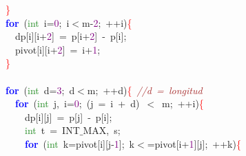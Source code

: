 {{\mbox{}\ \ \ \ \textcolor{Red}{\}} \\
\mbox{}\ \ \ \ \textbf{\textcolor{Blue}{for}}\ \textcolor{BrickRed}{(}\textcolor{ForestGreen}{int}\ i\textcolor{BrickRed}{=}\textcolor{Purple}{0}\textcolor{BrickRed}{;}\ i\textcolor{BrickRed}{$<$}m\textcolor{BrickRed}{-}\textcolor{Purple}{2}\textcolor{BrickRed}{;}\ \textcolor{BrickRed}{++}i\textcolor{BrickRed}{)}\textcolor{Red}{\{} \\
\mbox{}\ \ \ \ \ \ dp\textcolor{BrickRed}{[}i\textcolor{BrickRed}{][}i\textcolor{BrickRed}{+}\textcolor{Purple}{2}\textcolor{BrickRed}{]}\ \textcolor{BrickRed}{=}\ p\textcolor{BrickRed}{[}i\textcolor{BrickRed}{+}\textcolor{Purple}{2}\textcolor{BrickRed}{]}\ \textcolor{BrickRed}{-}\ p\textcolor{BrickRed}{[}i\textcolor{BrickRed}{];} \\
\mbox{}\ \ \ \ \ \ pivot\textcolor{BrickRed}{[}i\textcolor{BrickRed}{][}i\textcolor{BrickRed}{+}\textcolor{Purple}{2}\textcolor{BrickRed}{]}\ \textcolor{BrickRed}{=}\ i\textcolor{BrickRed}{+}\textcolor{Purple}{1}\textcolor{BrickRed}{;} \\
\mbox{}\ \ \ \ \textcolor{Red}{\}} \\
\mbox{}\ \ \ \  \\
\mbox{}\ \ \ \ \textbf{\textcolor{Blue}{for}}\ \textcolor{BrickRed}{(}\textcolor{ForestGreen}{int}\ d\textcolor{BrickRed}{=}\textcolor{Purple}{3}\textcolor{BrickRed}{;}\ d\textcolor{BrickRed}{$<$}m\textcolor{BrickRed}{;}\ \textcolor{BrickRed}{++}d\textcolor{BrickRed}{)}\textcolor{Red}{\{}\ \textit{\textcolor{Brown}{//d\ =\ longitud}} \\
\mbox{}\ \ \ \ \ \ \textbf{\textcolor{Blue}{for}}\ \textcolor{BrickRed}{(}\textcolor{ForestGreen}{int}\ j\textcolor{BrickRed}{,}\ i\textcolor{BrickRed}{=}\textcolor{Purple}{0}\textcolor{BrickRed}{;}\ \textcolor{BrickRed}{(}j\ \textcolor{BrickRed}{=}\ i\ \textcolor{BrickRed}{+}\ d\textcolor{BrickRed}{)}\ \textcolor{BrickRed}{$<$}\ m\textcolor{BrickRed}{;}\ \textcolor{BrickRed}{++}i\textcolor{BrickRed}{)}\textcolor{Red}{\{} \\
\mbox{}\ \ \ \ \ \ \ \ dp\textcolor{BrickRed}{[}i\textcolor{BrickRed}{][}j\textcolor{BrickRed}{]}\ \textcolor{BrickRed}{=}\ p\textcolor{BrickRed}{[}j\textcolor{BrickRed}{]}\ \textcolor{BrickRed}{-}\ p\textcolor{BrickRed}{[}i\textcolor{BrickRed}{];} \\
\mbox{}\ \ \ \ \ \ \ \ \textcolor{ForestGreen}{int}\ t\ \textcolor{BrickRed}{=}\ INT$\_$MAX\textcolor{BrickRed}{,}\ s\textcolor{BrickRed}{;} \\
\mbox{}\ \ \ \ \ \ \ \ \textbf{\textcolor{Blue}{for}}\ \textcolor{BrickRed}{(}\textcolor{ForestGreen}{int}\ k\textcolor{BrickRed}{=}pivot\textcolor{BrickRed}{[}i\textcolor{BrickRed}{][}j\textcolor{BrickRed}{-}\textcolor{Purple}{1}\textcolor{BrickRed}{];}\ k\textcolor{BrickRed}{$<$=}pivot\textcolor{BrickRed}{[}i\textcolor{BrickRed}{+}\textcolor{Purple}{1}\textcolor{BrickRed}{][}j\textcolor{BrickRed}{];}\ \textcolor{BrickRed}{++}k\textcolor{BrickRed}{)}\textcolor{Red}{\{} \\
}}
